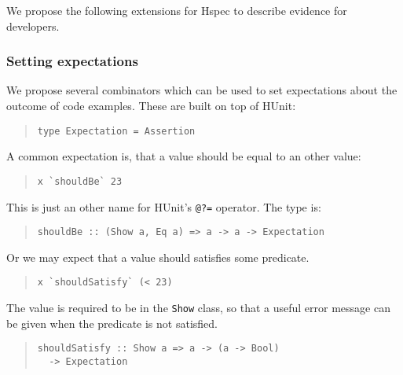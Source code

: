 \documentclass[preprint]{sigplanconf}
\begin{document}
We propose the following extensions for Hspec to
describe evidence for developers.

\subsubsection{Setting expectations}

We propose several combinators which can be used to set expectations
about the outcome of code examples.  These are built on top of HUnit:

\begin{quote}
\small
\begin{verbatim}
type Expectation = Assertion
\end{verbatim}
\end{quote}

\noindent A common expectation is, that a value should be equal to an other
value:

\begin{quote}
\small
\begin{verbatim}
x `shouldBe` 23
\end{verbatim}
\end{quote}

\noindent This is just an other name for HUnit's \texttt{@?=}
operator.  The type is:

\begin{quote}
\small
\begin{verbatim}
shouldBe :: (Show a, Eq a) => a -> a -> Expectation
\end{verbatim}
\end{quote}

\noindent Or we may expect that a value should satisfies some
predicate.

\begin{quote}
\small
\begin{verbatim}
x `shouldSatisfy` (< 23)
\end{verbatim}
\end{quote}

\noindent The value is required to be in the \texttt{Show} class, so that a
useful error message can be given when the predicate is not satisfied.

\begin{quote}
\small
\begin{verbatim}
shouldSatisfy :: Show a => a -> (a -> Bool)
  -> Expectation
\end{verbatim}
\end{quote}
\end{document}
